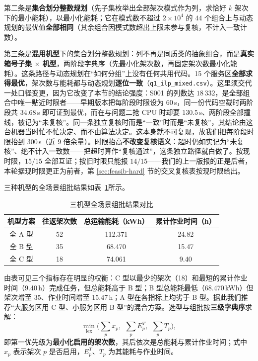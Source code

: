 第二条是\textbf{集合划分整数规划}（先子集枚举出全部架次模式作为列，求恰好 $k$ 架次下的最小能耗），以最小化能耗；它在模式数不超过 $2\times10^4$ 的 $44$ 个组合上与动态规划的最优值\textbf{全部相同}（其余组合因模式数超出上限未参与复核，不计入一致计数）。

第三条是\textbf{混用机型}下的集合划分整数规划：列不再是同质类的抽象组合，而是\textbf{真实箱号子集 $\times$ 机型}，两阶段字典序（先最小化架次数，再固定架次数最小化能耗）。这条路径与动态规划在“如何分组”上没有任何共用代码。15 个服务区\textbf{全部求得最优}，架次数与能耗都与动态规划\textbf{逐位一致}（\texttt{q1\_ilp\_mixed.csv}）。这里须交代一处口径变更，因为它改变了本节的结论强度：S001 的列数达 $18\,332$，是全部组合中唯一贴近时限者——早期版本把每阶段时限设为 $60$\,s，同一份代码空载时两阶段共 $34.68$\,s 即可证到最优，而在与问题二抢 CPU 时却要 $130.5$\,s、两阶段全部撞线，被记为“未复核”。同一条独立复核时而是“一致”时而是“未复核”，其结论由这台机器当时忙不忙决定、而不由算法决定。这本身就不可复现，故我们把每阶段时限抬到 $300$\,s（近 9 倍余量）。时限抬高\textbf{不改变复核语义}：超时仍如实记为“未复核”、绝不计入一致数——把超时算作“复核通过”，这条独立路径就白做了。按现时限，$15/15$ 全部互证；按旧时限只能报 $14/15$——我们的上一版报的正是后者，本轮据现时限更正为前者，第 \ref{sec:feasib-hard} 节的交叉复核表按现时限给出。

三种机型的全场景组批结果如表~\ref{tab:q1-batching}所示。

\begin{table}[htbp]
	\caption{三机型全场景组批结果对比}
	\label{tab:q1-batching}
	\centering
	\begin{tabular}{cccc}
		\toprule
		机型方案 & 往返架次数 & 总运输能耗（kWh） & 累计作业时间（h） \\
		\midrule
		全 A 型 & 52 & 112.371 & 24.82 \\
		全 B 型 & 35 & 68.470 & 15.47 \\
		全 C 型 & 18 & 74.061 & 9.40 \\
		\bottomrule
	\end{tabular}
\end{table}

由表可见三个指标存在明显的权衡：C 型以最少的架次（18）和最短的累计作业时间（9.40\,h）完成任务，但总能耗高于 B 型；B 型总能耗最低（68.470\,kWh）但架次增至 35、作业时间增至 15.47\,h；A 型在各指标上均劣于 B 型。据此我们推荐“大服务区用 C 型、小服务区用 B 型”的混合方案。选型与组批按\textbf{三级字典序}求解：
\begin{equation}
	\min_{\mathrm{lex}}\Big(\sum_{p} x_p,\ \ \sum_{p} E^T_p,\ \ \sum_{p} T_p\Big),
	\label{eq:q1-lex}
\end{equation}
即第一优先级为\textbf{最小化启用的架次数}，其后依次是总能耗与累计作业时间；式中 $x_p$ 表示架次 $p$ 是否启用，$E^T_p$、$T_p$ 为其能耗与作业时间。

